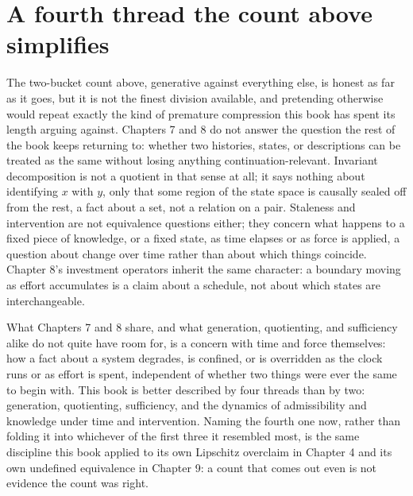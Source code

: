 \documentclass[11pt]{report}
\begin{document}
\section*{A fourth thread the count above simplifies}

The two-bucket count above, generative against everything else, is
honest as far as it goes, but it is not the finest division available,
and pretending otherwise would repeat exactly the kind of premature
compression this book has spent its length arguing against. Chapters
7 and 8 do not answer the question the rest of the book keeps
returning to: whether two histories, states, or descriptions can be
treated as the same without losing anything continuation-relevant.
Invariant decomposition is not a quotient in that sense at all; it
says nothing about identifying $x$ with $y$, only that some region of
the state space is causally sealed off from the rest, a fact about a
set, not a relation on a pair. Staleness and intervention are not
equivalence questions either; they concern what happens to a fixed
piece of knowledge, or a fixed state, as time elapses or as force is
applied, a question about change over time rather than about which
things coincide. Chapter 8's investment operators inherit the same
character: a boundary moving as effort accumulates is a claim about a
schedule, not about which states are interchangeable.

What Chapters 7 and 8 share, and what generation, quotienting, and
sufficiency alike do not quite have room for, is a concern with time
and force themselves: how a fact about a system degrades, is
confined, or is overridden as the clock runs or as effort is spent,
independent of whether two things were ever the same to begin with.
This book is better described by four threads than by two:
generation, quotienting, sufficiency, and the dynamics of
admissibility and knowledge under time and intervention. Naming the
fourth one now, rather than folding it into whichever of the first
three it resembled most, is the same discipline this book applied to
its own Lipschitz overclaim in Chapter 4 and its own undefined
equivalence in Chapter 9: a count that comes out even is not evidence
the count was right.
\end{document}
